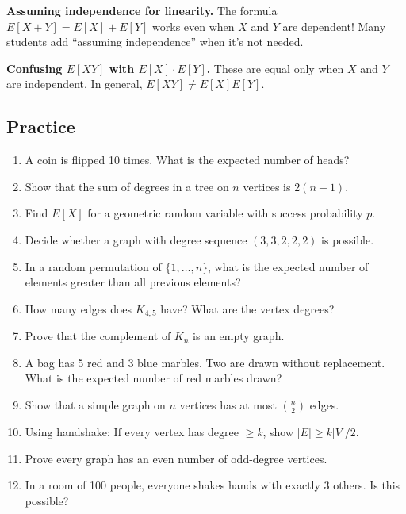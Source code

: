 \begin{commonmistake}
\textbf{Assuming independence for linearity.} The formula $E[X + Y] = E[X] + E[Y]$ works even when $X$ and $Y$ are dependent! Many students add ``assuming independence'' when it's not needed.
\end{commonmistake}

\begin{commonmistake}
\textbf{Confusing $E[XY]$ with $E[X] \cdot E[Y]$.} These are equal only when $X$ and $Y$ are independent. In general, $E[XY] \neq E[X]E[Y]$.
\end{commonmistake}

\subsection*{Practice}
\begin{enumerate}
  \item A coin is flipped 10 times. What is the expected number of heads?

  \item Show that the sum of degrees in a tree on $n$ vertices is $2(n-1)$.

  \item Find $E[X]$ for a geometric random variable with success probability $p$.

  \item Decide whether a graph with degree sequence $(3, 3, 2, 2, 2)$ is possible.

  \item In a random permutation of $\{1, \ldots, n\}$, what is the expected number of elements greater than all previous elements?

  \item How many edges does $K_{4,5}$ have? What are the vertex degrees?

  \item Prove that the complement of $K_n$ is an empty graph.

  \item A bag has 5 red and 3 blue marbles. Two are drawn without replacement. What is the expected number of red marbles drawn?

  \item Show that a simple graph on $n$ vertices has at most $\binom{n}{2}$ edges.

  \item Using handshake: If every vertex has degree $\geq k$, show $|E| \geq k|V|/2$.

  \item Prove every graph has an even number of odd-degree vertices.

  \item In a room of 100 people, everyone shakes hands with exactly 3 others. Is this possible?
\end{enumerate}
